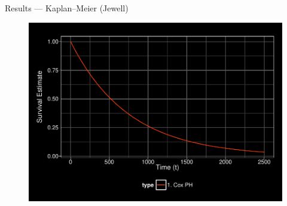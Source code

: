 \documentclass[12pt,t]{beamer}
\begin{document}
\begin{frame}[c]{Results --- Kaplan--Meier (Jewell)}

\begin{center}
\begin{figure}[H]
\begin{center}
\includegraphics[width=\textwidth]{Figs/s1_cox.pdf}
\end{center}
\label{fig:s1_cox}
\end{figure}
\end{center}

\note{
}

\end{frame}

\end{document}
